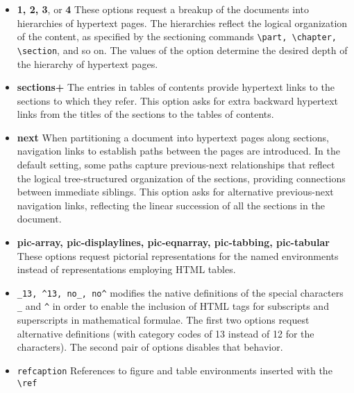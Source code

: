 \begin{itemize}
  \item \textbf{1, 2, 3}, or \textbf{4} These options request a breakup of the documents
    into hierarchies of hypertext pages. The hierarchies reflect the
    logical organization of the content, as specified by the sectioning
    commands \verb|\part, \chapter, \section|, and so on. The values of
    the option determine the desired depth of the hierarchy of hypertext pages. 
  \item \textbf{sections+} The entries in tables of contents provide
    hypertext links to the sections to which they refer. This option
    asks for extra backward hypertext links from the titles of the
    sections to the tables of contents. 
  \item \textbf{next} When partitioning a document into hypertext pages
    along sections, navigation links to establish paths between the
    pages are introduced. In the default setting, some paths capture
    previous-next relationships that reflect the logical tree-structured
    organization of the sections, providing connections between
    immediate siblings. This option asks for alternative previous-next
    navigation links, reflecting the linear succession of all the
    sections in the document. 
  \item \textbf{pic-array, pic-displaylines, pic-eqnarray, pic-tabbing, pic-tabular} 
    These options request pictorial representations for the named environments 
    instead of representations employing HTML tables. 
  \item \verb|_13, ^13, no_, no^| \texht modifies the native definitions
    of the special characters \verb|_| and \verb|^| in order to
    enable the inclusion of HTML tags for subscripts and superscripts in
    mathematical formulae. The first two options request alternative
    definitions (with category codes of 13 instead of 12 for the
    characters). The second pair of options disables that behavior. 
  \item \verb|refcaption| References to figure and table environments inserted with the \verb|\ref|

\end{itemize}
